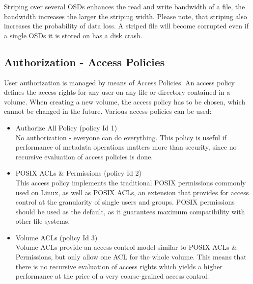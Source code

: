 \documentclass[a4paper,10pt]{book}
\begin{document}
Striping over several OSDs enhances the read and write bandwidth of a file, the bandwidth increases the larger the striping width. Please note, that striping also increases the probability of data loss. A striped file will become corrupted even if a single OSDs it is stored on has a disk crash.

\subsection{Authorization - Access Policies} \label{sec:access_policies}

User authorization is managed by means of Access Policies. An access policy defines the access rights for any user on any file or directory contained in a volume. When creating a new volume, the access policy has to be chosen, which cannot be changed in the future. Various access policies can be used: 

\begin{itemize}
 \item Authorize All Policy (policy Id 1)\\
No authorization - everyone can do everything. This policy is useful if performance of metadata operations matters more than security, since no recursive evaluation of access policies is done.

 \item POSIX ACLs \& Permissions (policy Id 2)\\
This access policy implements the traditional POSIX permissions commonly used on Linux, as well as POSIX ACLs, an extension that provides for access control at the granularity of single users and groups. POSIX permissions should be used as the default, as it guarantees maximum compatibility with other file systems.

\item Volume ACLs (policy Id 3)\\
Volume ACLs provide an access control model similar to POSIX ACLs \& Permissions, but only allow one ACL for the whole volume. This means that there is no recursive evaluation of access rights which yields a higher performance at the price of a very coarse-grained access control. 
\end{itemize}
\end{document}
